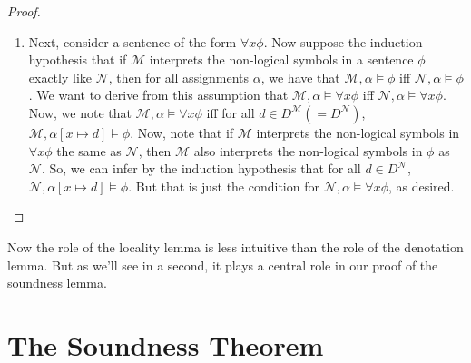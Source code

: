 \begin{enumerate}[\thesection.1]
\begin{proof}
\begin{enumerate}
                  \item Next, consider a sentence of the form $\forall
                    x\phi$. Now suppose the induction hypothesis that
                    if $\mathcal{M}$ interprets the non-logical
                    symbols in a sentence $\phi$ exactly like $\mathcal{N}$, then
                    for all assignments $\alpha$, we have that
                    $\mathcal{M},\alpha\vDash\phi$ iff
                    $\mathcal{N},\alpha\vDash\phi$. We want to derive
                    from this assumption that
                    $\mathcal{M},\alpha\vDash\forall x\phi$ iff
                    $\mathcal{N},\alpha\vDash\forall x\phi$. Now, we
                    note that $\mathcal{M},\alpha\vDash\forall x\phi$
                    iff for all $d\in D^\mathcal{M}(=D^\mathcal{N})$,
                    $\mathcal{M},\alpha[x\mapsto d]\vDash\phi$. Now,
                    note that if $\mathcal{M}$ interprets the
                    non-logical symbols in $\forall x\phi$ the same as
                    $\mathcal{N}$, then $\mathcal{M}$ also interprets
                    the non-logical symbols in $\phi$ as
                    $\mathcal{N}$. So, we can infer by the induction
                    hypothesis that for all $d\in D^\mathcal{N}$,
                    $\mathcal{N},\alpha[x\mapsto d]\vDash\phi$. But
                    that is just the condition for
                    $\mathcal{N},\alpha\vDash\forall x\phi$, as desired.

                \end{enumerate}
            \end{proof}
            Now the role of the locality lemma is less intuitive than
            the role of the denotation lemma. But as we'll see in a
            second, it plays a central role in our proof of the
            soundness lemma.
		
	\end{enumerate}

\section{The Soundness Theorem}

